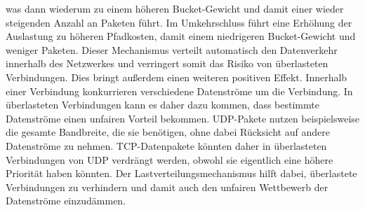 was dann wiederum zu einem höheren Bucket-Gewicht und damit einer wieder steigenden Anzahl an Paketen führt. Im Umkehrschluss führt eine Erhöhung der Auslastung zu höheren Pfadkosten, damit einem niedrigeren Bucket-Gewicht 
und weniger Paketen. Dieser Mechanismus verteilt automatisch den Datenverkehr innerhalb des Netzwerkes und verringert somit das Risiko von überlasteten Verbindungen. Dies bringt außerdem einen weiteren positiven Effekt. 
Innerhalb einer Verbindung konkurrieren verschiedene Datenströme um die Verbindung. In überlasteten Verbindungen kann es daher dazu kommen, dass bestimmte Datenströme einen unfairen Vorteil bekommen. 
UDP-Pakete nutzen beispielsweise die gesamte Bandbreite, die sie benötigen, ohne dabei Rücksicht auf andere Datenströme zu nehmen. TCP-Datenpakete könnten daher in überlasteten Verbindungen von UDP verdrängt werden, 
obwohl sie eigentlich eine höhere Priorität haben könnten. Der Lastverteilungsmechanismus hilft dabei, überlastete Verbindungen zu verhindern und damit auch den unfairen Wettbewerb der Datenströme einzudämmen.

